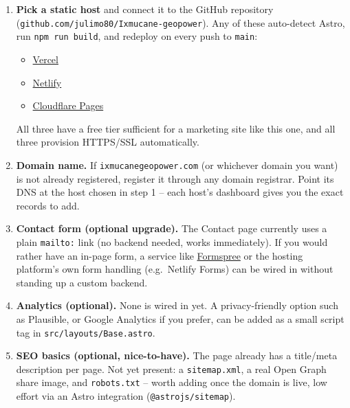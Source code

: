 \documentclass[11pt]{article}
\newcommand{\code}[1]{\texttt{\small #1}}
\newcommand{\file}[1]{\texttt{\small\color{ixaccent}#1}}
\begin{document}
\begin{enumerate}[leftmargin=1.4em]
  \item \textbf{Pick a static host} and connect it to the GitHub repository
    (\file{github.com/julimo80/Ixmucane-geopower}). Any of these
    auto-detect Astro, run \code{npm run build}, and redeploy on every push
    to \code{main}:
    \begin{itemize}[leftmargin=1.2em]
      \item \href{https://vercel.com}{Vercel}
      \item \href{https://netlify.com}{Netlify}
      \item \href{https://pages.cloudflare.com}{Cloudflare Pages}
    \end{itemize}
    All three have a free tier sufficient for a marketing site like this
    one, and all three provision HTTPS/SSL automatically.
  \item \textbf{Domain name.} If \code{ixmucanegeopower.com} (or whichever
    domain you want) is not already registered, register it through any
    domain registrar. Point its DNS at the host chosen in step 1 --
    each host's dashboard gives you the exact records to add.
  \item \textbf{Contact form (optional upgrade).} The Contact page currently
    uses a plain \code{mailto:} link (no backend needed, works immediately).
    If you would rather have an in-page form, a service like
    \href{https://formspree.io}{Formspree} or the hosting platform's own
    form handling (e.g.\ Netlify Forms) can be wired in without standing up
    a custom backend.
  \item \textbf{Analytics (optional).} None is wired in yet. A
    privacy-friendly option such as Plausible, or Google Analytics if you
    prefer, can be added as a small script tag in
    \file{src/layouts/Base.astro}.
  \item \textbf{SEO basics (optional, nice-to-have).} The page already has a
    title/meta description per page. Not yet present: a
    \file{sitemap.xml}, a real Open Graph share image, and
    \file{robots.txt} -- worth adding once the domain is live, low effort
    via an Astro integration (\code{@astrojs/sitemap}).
\end{enumerate}
\end{document}
